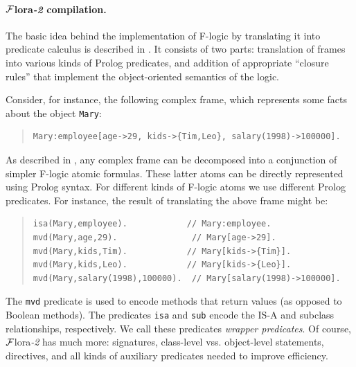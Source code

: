 \documentclass[11pt]{article}
\newcommand{\FLSYSTEM}{{\mbox{\sc ${\cal F}${lora}\rm\emph{-2}}}\xspace}
\newcommand{\fl}{\mbox{F-logic}\xspace}
\begin{document}
\paragraph{\FLSYSTEM compilation.}
The basic idea behind the implementation of \fl by translating it into
predicate calculus is described in \cite{KLW95}. It consists of two parts:
translation of frames into various kinds of Prolog predicates, and
addition of appropriate ``closure rules'' that implement the
object-oriented semantics of the logic.

Consider, for instance, the following complex frame, which represents
some facts about the object \texttt{Mary}:

\begin{quote}
\begin{verbatim}
Mary:employee[age->29, kids->{Tim,Leo}, salary(1998)->100000].
\end{verbatim}
\end{quote}

As described in \cite{KLW95}, any complex frame can be
decomposed into a conjunction of simpler \fl atomic formulas. These
latter atoms can be directly represented using Prolog syntax.  For
different kinds of \fl atoms we use different Prolog predicates. For
instance, the result of translating the above frame might be:

\begin{quote}
\begin{verbatim}
isa(Mary,employee).            // Mary:employee.
mvd(Mary,age,29).               // Mary[age->29].
mvd(Mary,kids,Tim).            // Mary[kids->{Tim}].
mvd(Mary,kids,Leo).            // Mary[kids->{Leo}].
mvd(Mary,salary(1998),100000).  // Mary[salary(1998)->100000].
\end{verbatim}
\end{quote}

The {\tt mvd} predicate is used to encode methods that return values (as
opposed to Boolean methods).
The predicates {\tt isa} and {\tt sub}
encode the IS-A and subclass relationships, respectively.
We call these predicates \emph{wrapper predicates}. 
Of course, \FLSYSTEM has much more: signatures, class-level
vss. object-level
statements, directives, and all kinds of auxiliary predicates
needed to improve efficiency.
\end{document}
